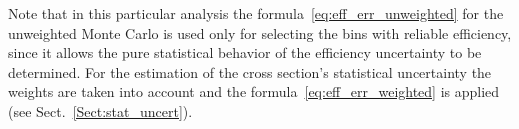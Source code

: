Note that in this particular analysis the formula~\eqref{eq:eff_err_unweighted} for the unweighted Monte Carlo is used only for selecting the bins with reliable efficiency, since it allows the pure statistical behavior of the efficiency uncertainty to be determined. For the estimation of the cross section's statistical uncertainty the weights are taken into account and the formula~\eqref{eq:eff_err_weighted} is applied (see Sect.~\ref{Sect:stat_uncert}).


 
